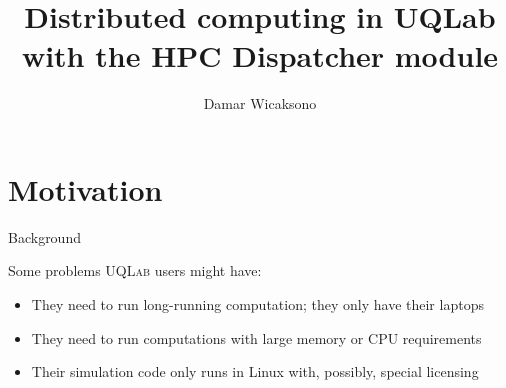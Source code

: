 \documentclass[]{rsuqbeamernew}
\title[]{Distributed computing in UQLab\\with the HPC Dispatcher module}
\author[D. Wicaksono]{Damar Wicaksono}
\institute[RSUQ, ETH Z\"urich]{Chair of Risk, Safety and Uncertainty 
Quantification -- ETH Z\"urich}
\date[09.05.2019]
\begin{document}
\section{Motivation}

\begin{frame}{Background}

\begin{block}{Some problems \textsc{UQLab} users might have:}
\begin{itemize}
  \item They need to run long-running computation; they only have their laptops\\
  \item They need to run computations with large memory or CPU requirements\\
  \item Their simulation code only runs in Linux with, possibly, special licensing
\end{itemize}
\end{block}

\end{frame}
\end{document}
